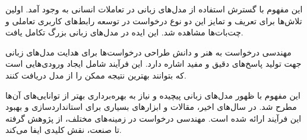 این مفهوم با گسترش استفاده از مدل‌های زبانی در تعاملات انسانی به وجود آمد. اولین تلاش‌ها برای تعریف و تمایز این دو نوع درخواست در توسعه رابط‌های کاربری تعاملی و چت‌بات‌ها مشاهده شد. این ایده در مدل‌های زبانی بزرگ تکامل یافت.

مهندسی درخواست به هنر و دانش طراحی درخواست‌ها برای هدایت مدل‌های زبانی جهت تولید پاسخ‌های دقیق و مفید اشاره دارد. این فرآیند شامل ایجاد ورودی‌هایی است که بتوانند بهترین نتیجه ممکن را از مدل دریافت کنند.

این مفهوم با ظهور مدل‌های زبانی پیچیده و نیاز به بهره‌برداری بهتر از توانایی‌های آن‌ها مطرح شد. در سال‌های اخیر، مقالات و ابزارهای بسیاری برای استانداردسازی و بهبود این فرآیند ارائه شده است. مهندسی درخواست در زمینه‌های مختلف، از پژوهش گرفته تا صنعت، نقش کلیدی ایفا می‌کند.